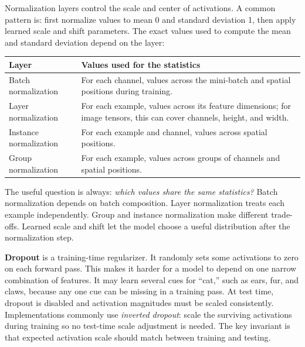 \hypertarget{04-visual-computing-ii-ch031-cnn-layers-need-stable-signals-and-enough-variation}{}

Normalization layers control the scale and center of activations. A common pattern is: first normalize values to mean 0 and standard deviation 1, then apply learned scale and shift parameters. The exact values used to compute the mean and standard deviation depend on the layer:

{\def\LTcaptype{none} %
\begin{longtable}[]{@{}
  >{\raggedright\arraybackslash}p{}
  >{\raggedright\arraybackslash}p{}@{}}
\toprule\noalign{}
\begin{minipage}[b]{\linewidth}\raggedright
Layer
\end{minipage} & \begin{minipage}[b]{\linewidth}\raggedright
Values used for the statistics
\end{minipage} \\
\midrule\noalign{}
\endhead
\bottomrule\noalign{}
\endlastfoot
Batch normalization & For each channel, values across the mini-batch and spatial positions during training. \\
Layer normalization & For each example, values across its feature dimensions; for image tensors, this can cover channels, height, and width. \\
Instance normalization & For each example and channel, values across spatial positions. \\
Group normalization & For each example, values across groups of channels and spatial positions. \\
\end{longtable}
}

The useful question is always: \emph{which values share the same statistics?} Batch normalization depends on batch composition. Layer normalization treats each example independently. Group and instance normalization make different trade-offs. Learned scale and shift let the model choose a useful distribution after the normalization step.

\textbf{Dropout} is a training-time regularizer. It randomly sets some activations to zero on each forward pass. This makes it harder for a model to depend on one narrow combination of features. It may learn several cues for ``cat,'' such as ears, fur, and claws, because any one cue can be missing in a training pass. At test time, dropout is disabled and activation magnitudes must be scaled consistently. Implementations commonly use \emph{inverted dropout}: scale the surviving activations during training so no test-time scale adjustment is needed. The key invariant is that expected activation scale should match between training and testing.

